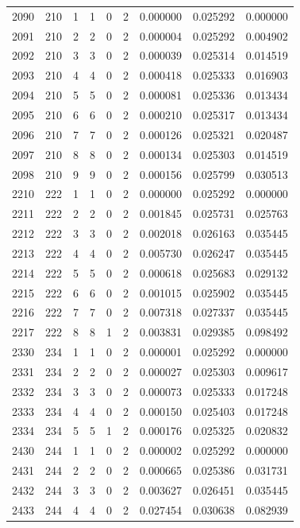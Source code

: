 \begin{longtable}{rrrrrrrrr}
2090 & 210 & 1 & 1 & 0 & 2 & 0.000000 & 0.025292 & 0.000000 \\
2091 & 210 & 2 & 2 & 0 & 2 & 0.000004 & 0.025292 & 0.004902 \\
2092 & 210 & 3 & 3 & 0 & 2 & 0.000039 & 0.025314 & 0.014519 \\
2093 & 210 & 4 & 4 & 0 & 2 & 0.000418 & 0.025333 & 0.016903 \\
2094 & 210 & 5 & 5 & 0 & 2 & 0.000081 & 0.025336 & 0.013434 \\
2095 & 210 & 6 & 6 & 0 & 2 & 0.000210 & 0.025317 & 0.013434 \\
2096 & 210 & 7 & 7 & 0 & 2 & 0.000126 & 0.025321 & 0.020487 \\
2097 & 210 & 8 & 8 & 0 & 2 & 0.000134 & 0.025303 & 0.014519 \\
2098 & 210 & 9 & 9 & 0 & 2 & 0.000156 & 0.025799 & 0.030513 \\
2210 & 222 & 1 & 1 & 0 & 2 & 0.000000 & 0.025292 & 0.000000 \\
2211 & 222 & 2 & 2 & 0 & 2 & 0.001845 & 0.025731 & 0.025763 \\
2212 & 222 & 3 & 3 & 0 & 2 & 0.002018 & 0.026163 & 0.035445 \\
2213 & 222 & 4 & 4 & 0 & 2 & 0.005730 & 0.026247 & 0.035445 \\
2214 & 222 & 5 & 5 & 0 & 2 & 0.000618 & 0.025683 & 0.029132 \\
2215 & 222 & 6 & 6 & 0 & 2 & 0.001015 & 0.025902 & 0.035445 \\
2216 & 222 & 7 & 7 & 0 & 2 & 0.007318 & 0.027337 & 0.035445 \\
2217 & 222 & 8 & 8 & 1 & 2 & 0.003831 & 0.029385 & 0.098492 \\
2330 & 234 & 1 & 1 & 0 & 2 & 0.000001 & 0.025292 & 0.000000 \\
2331 & 234 & 2 & 2 & 0 & 2 & 0.000027 & 0.025303 & 0.009617 \\
2332 & 234 & 3 & 3 & 0 & 2 & 0.000073 & 0.025333 & 0.017248 \\
2333 & 234 & 4 & 4 & 0 & 2 & 0.000150 & 0.025403 & 0.017248 \\
2334 & 234 & 5 & 5 & 1 & 2 & 0.000176 & 0.025325 & 0.020832 \\
2430 & 244 & 1 & 1 & 0 & 2 & 0.000002 & 0.025292 & 0.000000 \\
2431 & 244 & 2 & 2 & 0 & 2 & 0.000665 & 0.025386 & 0.031731 \\
2432 & 244 & 3 & 3 & 0 & 2 & 0.003627 & 0.026451 & 0.035445 \\
2433 & 244 & 4 & 4 & 0 & 2 & 0.027454 & 0.030638 & 0.082939 \\

\end{longtable}
